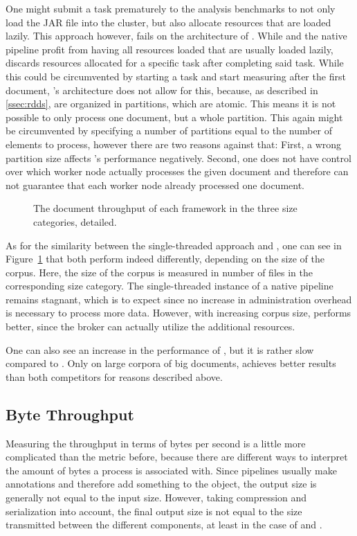 One might submit a task prematurely to the analysis benchmarks to not only load the JAR file into the \spark{} cluster, but also allocate resources that are loaded lazily. This approach however, fails on the architecture of \spark{}. While \uimaas{} and the native \uima{} pipeline profit from having all resources loaded that are usually loaded lazily, \spark{} discards resources allocated for a specific task after completing said task. While this could be circumvented by starting a task and start measuring after the first document, \spark{}'s architecture does not allow for this, because, as described in \ref{ssec:rdds}, \rdds{}  are organized in partitions, which are atomic. This means it is not possible to only process one document, but a whole partition. This again might be circumvented by specifying a number of partitions equal to the number of elements to process, however there are two reasons against that: First, a wrong partition size affects \spark{}'s performance negatively. Second, one does not have control over which worker node actually processes the given document and therefore can not guarantee that each worker node already processed one document.
\begin{figure}[htb]
	\centering
	\resizebox{1.\linewidth}{!}{\small}
	\caption{The document throughput of each framework in the three size categories, detailed.}
	\label{fig:result:throughput_det}
\end{figure}
As for the similarity between the single-threaded approach and \uimaas{}, one can see in Figure~\ref{fig:result:throughput_det} that both perform indeed differently, depending on the size of the corpus. Here, the size of the corpus is measured in number of files in the corresponding size category. The single-threaded instance of a native \uima{} pipeline remains stagnant, which is to expect since no increase in administration overhead is necessary to process more data. However, with increasing corpus size, \uimaas{} performs better, since the broker can actually utilize the additional resources.

One can also see an increase in the performance of \spark{}, but it is rather slow compared to \uimaas{}. Only on large corpora of big documents, \spark{} achieves better results than both competitors for reasons described above.

\subsection{Byte Throughput}
Measuring the throughput in terms of bytes per second is a little more complicated than the metric before, because there are different ways to interpret the amount of bytes a process is associated with. Since pipelines usually make annotations and therefore add something to the \cas{} object, the output size is generally not equal to the input size. However, taking compression and serialization into account, the final output size is not equal to the size transmitted between the different components, at least in the case of \spark{} and \uimaas{}.

